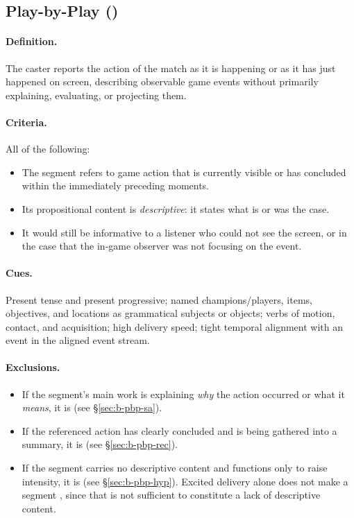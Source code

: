 \subsection{Play-by-Play (\cPBP{})}
\label{sec:def-pbp}

\paragraph{Definition.} The caster reports the action of the match as it
is happening or as it has just happened on screen, describing observable
game events without primarily explaining, evaluating, or projecting them.

\paragraph{Criteria.} All of the following:
\begin{itemize}
  \item The segment refers to game action that is currently visible or has concluded within the immediately preceding moments.
  \item Its propositional content is \emph{descriptive}: it states what is or was the case.
  \item It would still be informative to a listener who could not see the screen, or in the case that the in-game observer was not focusing on the event.
\end{itemize}

\paragraph{Cues.} Present tense and present progressive; named champions/players, items, objectives, and locations as grammatical subjects or objects; verbs of motion, contact, and acquisition; high delivery speed; tight temporal alignment with an event in the aligned event stream.

\paragraph{Exclusions.}
\begin{itemize}
  \item If the segment's main work is explaining \emph{why} the action occurred or what it \emph{means}, it is \SA{} (see \S\ref{sec:b-pbp-sa}).
  \item If the referenced action has clearly concluded and is being gathered into a summary, it is \REC{} (see \S\ref{sec:b-pbp-rec}).
  \item If the segment carries no descriptive content and functions only to raise intensity, it is \HYP{} (see \S\ref{sec:b-pbp-hyp}). Excited delivery alone does not make a segment \HYP{}, since that is not sufficient to constitute a lack of descriptive content.
\end{itemize}

